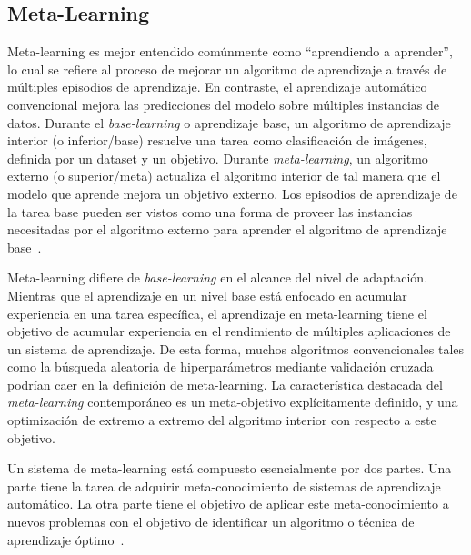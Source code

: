 \documentclass[a4paper,10pt,twocolumn]{article}
\begin{document}
	\subsection{Meta-Learning}\label{sub:metalearning}
Meta-learning es mejor entendido comúnmente como ``aprendiendo a aprender'', lo cual se refiere al proceso de mejorar un algoritmo de aprendizaje a través de múltiples episodios de aprendizaje. En contraste, el aprendizaje automático convencional mejora las predicciones del modelo sobre múltiples instancias de datos. Durante el \textit{base-learning} o aprendizaje base, un algoritmo de aprendizaje interior (o inferior/base) resuelve una tarea como clasificación de imágenes, definida por un dataset y un objetivo. Durante \emph{meta-learning}, un algoritmo externo (o superior/meta) actualiza el algoritmo interior de tal manera que el modelo que aprende mejora un objetivo externo. Los episodios de aprendizaje de la tarea base pueden ser vistos como una forma de proveer las instancias necesitadas por el algoritmo externo para aprender el algoritmo de aprendizaje base~\cite{hospedales2021metalearning}. 

Meta-learning difiere de \textit{base-learning} en el alcance del nivel de adaptación. Mientras que el aprendizaje en un nivel base está enfocado en acumular experiencia en una tarea específica, el aprendizaje en meta-learning tiene el objetivo de acumular experiencia en el rendimiento de múltiples aplicaciones de un sistema de aprendizaje. De esta forma, muchos algoritmos convencionales tales como la búsqueda aleatoria de hiperparámetros mediante validación cruzada podrían caer en la definición de meta-learning. La característica destacada del \emph{meta-learning} contemporáneo es un meta-objetivo explícitamente definido, y una optimización de extremo a extremo del algoritmo interior con respecto a este objetivo.

Un sistema de meta-learning está compuesto esencialmente por dos partes. Una parte tiene la tarea de adquirir meta-conocimiento de sistemas de aprendizaje automático. La otra parte tiene el objetivo de aplicar este meta-conocimiento a nuevos problemas con el objetivo de identificar un algoritmo o técnica de aprendizaje óptimo~\cite{bradzil2017metalearning}.
\end{document}
